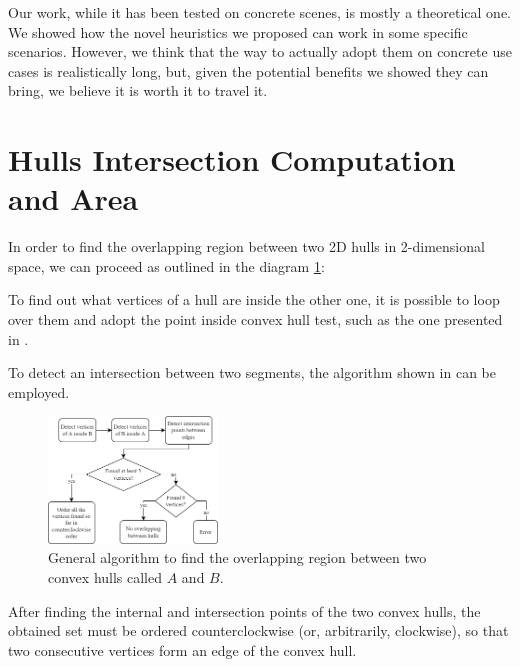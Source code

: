 \documentclass[acmtog, anonymous, review]{acmart}
\begin{document}
Our work, while it has been tested on concrete scenes, is mostly a theoretical one. We showed how the novel heuristics we proposed can work in some specific scenarios. However, we think that the way to actually adopt them on concrete use cases is realistically long, but, given the potential benefits we showed they can bring, we believe it is worth it to travel it.




\appendix

\section{Hulls Intersection Computation and Area} \label{apx:overlapping_hull_computation}
In order to find the overlapping region between two 2D hulls in 2-dimensional space, we can proceed as outlined in the diagram \ref{fig:hull_culling_algo}:

To find out what vertices of a hull are inside the other one, it is possible to loop over them and adopt the point inside convex hull test, such as the one presented in \cite{point_inside_test}.

To detect an intersection between two segments, the algorithm shown in \cite{segments_intersection} can be employed.

\begin{figure}[H]
  \centering
  \includegraphics[width=0.4\textwidth]{Images/hull_culling.png} 
  \caption{General algorithm to find the overlapping region between two convex hulls called $A$ and $B$.}
  \label{fig:hull_culling_algo}
\end{figure}

After finding the internal and intersection points of the two convex hulls, the obtained set must be ordered counterclockwise (or, arbitrarily, clockwise), so that two consecutive vertices form an edge of the convex hull.
\end{document}
